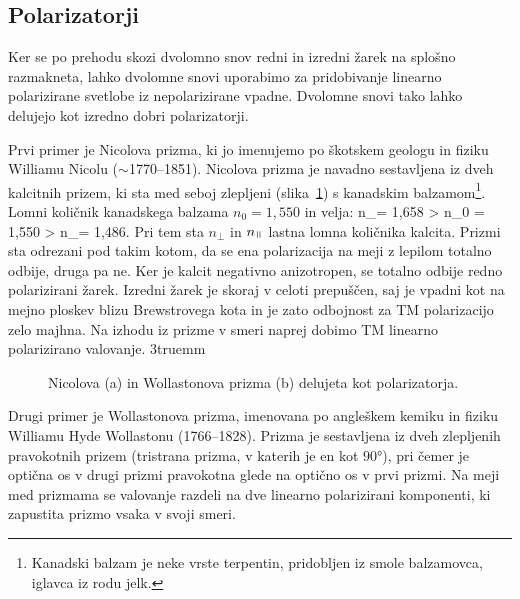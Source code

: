 \subsection*{Polarizatorji}
Ker se po prehodu skozi dvolomno snov redni in izredni žarek na splošno razmakneta, 
lahko dvolomne snovi uporabimo za pridobivanje linearno polarizirane svetlobe iz nepolarizirane
vpadne. Dvolomne snovi tako lahko delujejo kot izredno dobri polarizatorji.

Prvi primer je Nicolova prizma, ki jo imenujemo po škotskem geologu in fiziku
Williamu Nicolu ($\sim$1770--1851). Nicolova prizma je navadno sestavljena iz dveh kalcitnih prizem, ki 
sta med seboj zlepljeni (slika~\ref{fig:10_Nicol}) s kanadskim balzamom\footnote{Kanadski balzam je neke vrste 
terpentin, pridobljen iz smole balzamovca, iglavca iz rodu jelk.}. 
Lomni količnik kanadskega balzama $n_0=1,550$ in velja:
\beq
n_\perp = 1,658 > n_0 = 1,550 > n_\myparallel = 1,486.
\label{eq:10_119}
\eeq
Pri tem sta $n_\perp$ in $n_\myparallel$ lastna lomna količnika kalcita. 
Prizmi sta odrezani pod takim kotom, da se ena polarizacija na 
meji z lepilom totalno odbije, druga pa ne. 
Ker je kalcit negativno anizotropen, se totalno odbije redno polarizirani
žarek. Izredni žarek je skoraj v celoti prepuščen, saj je vpadni kot na mejno ploskev
blizu Brewstrovega kota in je zato odbojnost za TM polarizacijo zelo majhna. 
Na izhodu iz prizme v smeri naprej dobimo TM linearno polarizirano valovanje.
\vglue3truemm
\begin{figure}[!h]
\centering
\def\svgwidth{130truemm} 

\caption{Nicolova (a) in Wollastonova prizma (b) delujeta kot polarizatorja.}
\label{fig:10_Nicol}
\end{figure}

Drugi primer je Wollastonova prizma, imenovana po angleškem kemiku in fiziku 
Williamu Hyde Wollastonu (1766--1828). Prizma je sestavljena iz dveh zlepljenih pravokotnih prizem (tristrana
prizma, v katerih je en kot $90\si{\degree}$), 
pri čemer je optična os v drugi prizmi pravokotna glede na optično os v prvi prizmi. 
Na meji med prizmama se valovanje razdeli na dve linearno polarizirani komponenti, 
ki zapustita prizmo vsaka v svoji smeri. 

